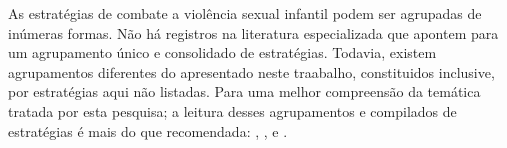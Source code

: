 

\vspace{-0.35cm}

As estratégias de combate a violência sexual infantil podem ser agrupadas de inúmeras formas. Não há registros na literatura especializada que apontem para um agrupamento único e consolidado de estratégias. Todavia, existem  agrupamentos diferentes do apresentado neste traabalho, constituidos inclusive, por estratégias aqui não listadas. Para uma melhor compreensão da temática tratada por esta pesquisa; a leitura desses agrupamentos e compilados de estratégias é mais do que recomendada: , ,  e .

























